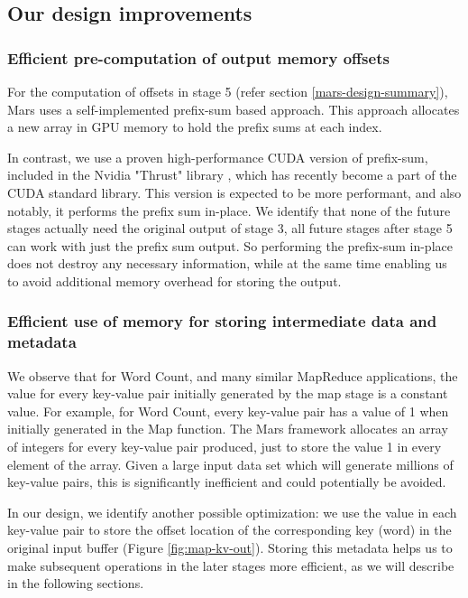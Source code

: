 \documentclass{article}
\begin{document}
\subsection{Our design improvements} \label{our-improved-design}
\subsubsection{Efficient pre-computation of output memory offsets}
For the computation of offsets in stage 5 (refer section \ref{mars-design-summary}), Mars uses a self-implemented prefix-sum based approach. This approach allocates a new array in GPU memory to hold the prefix sums at each index.

In contrast, we use a proven high-performance CUDA version of prefix-sum, included in the Nvidia "Thrust" library \cite{nvidia_thrust}, which has recently become a part of the CUDA standard library. This version is expected to be more performant, and also notably, it performs the prefix sum in-place. We identify that none of the future stages actually need the original output of stage 3, all future stages after stage 5 can work with just the prefix sum output. So performing the prefix-sum in-place does not destroy any necessary information, while at the same time enabling us to avoid additional memory overhead for storing the output.

\subsubsection{Efficient use of memory for storing intermediate data and metadata} \label{efficient-metadata}
We observe that for Word Count, and many similar MapReduce applications, the value for every key-value pair initially generated by the map stage is a constant value. For example, for Word Count, every key-value pair has a value of 1 when initially generated in the Map function. The Mars framework allocates an array of integers for every key-value pair produced, just to store the value 1 in every element of the array. Given a large input data set which will generate millions of key-value pairs, this is significantly inefficient and could potentially be avoided. 

In our design, we identify another possible optimization: we use the value in each key-value pair to store the offset location of the corresponding key (word) in the original input buffer (Figure \ref{fig:map-kv-out}). Storing this metadata helps us to make subsequent operations in the later stages more efficient, as we will describe in the following sections. 
\end{document}
